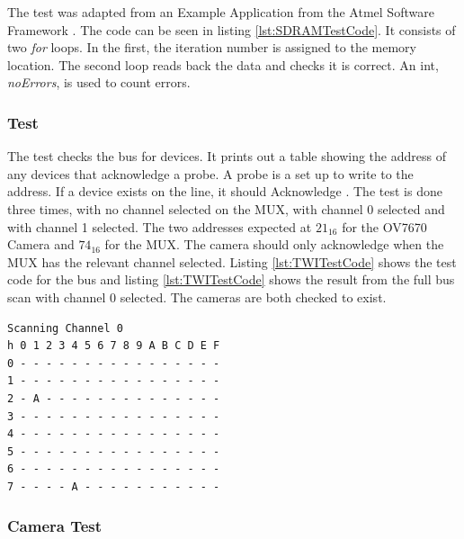 The test was adapted from an Example Application from the Atmel Software Framework \citep{Atmel:ASF}. The code can be seen in listing \ref{lst:SDRAMTestCode}. It consists of two \textit{for} loops. In the first, the iteration number is assigned to the memory location. The second loop reads back the data and checks it is correct. An int, \textit{noErrors}, is used to count errors. 



\subsubsection{\itc Test}
The \itc test checks the bus for devices. It prints out a table showing the address of any devices that acknowledge a probe. A probe is a set up to write to the address. If a device exists on the line, it should Acknowledge \citep{Philips:I2C}. The test is done three times, with no channel selected on the \itc MUX, with channel 0 selected and with channel 1 selected. The two addresses expected at $21_{16}$ for the OV7670 Camera and $74_{16}$ for the \itc MUX. The camera should only acknowledge when the \itc MUX has the relevant channel selected. Listing \ref{lst:TWITestCode} shows the test code for the \itc bus and listing \ref{lst:TWITestCode} shows the result from the full bus scan with channel 0 selected. The cameras are both checked to exist.


\begin{lstlisting}[caption={Result of \itc bus scan with Channel 0 of the \itc MUX selected},label={lst:I2CTest}]
Scanning Channel 0
h 0 1 2 3 4 5 6 7 8 9 A B C D E F
0 - - - - - - - - - - - - - - - -
1 - - - - - - - - - - - - - - - -
2 - A - - - - - - - - - - - - - -
3 - - - - - - - - - - - - - - - -
4 - - - - - - - - - - - - - - - -
5 - - - - - - - - - - - - - - - -
6 - - - - - - - - - - - - - - - -
7 - - - - A - - - - - - - - - - -
\end{lstlisting}

\subsubsection{Camera Test}

